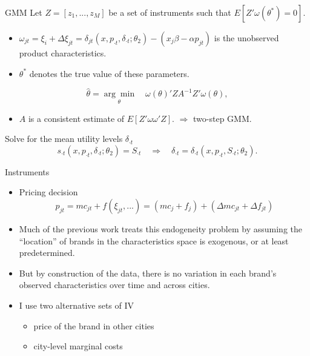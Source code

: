 \documentclass{beamer}
\begin{document}
\begin{frame}{GMM}
	Let $Z=[z_1,...,z_M]$ be a set of instruments such that $E[Z'\omega(\theta^*)=0]$.
	\begin{itemize}
		\item $\omega_{jt}=\xi_i+\Delta\xi_{jt}=\delta_{jt}(x,p_{\cdot t},\delta_{\cdot t};\theta_2)-(x_j\beta-\alpha p_{jt})$ is the unobserved product characteristics.
		\item $\theta^*$ denotes the true value of these parameters.
	\end{itemize}

	\begin{equation}
		\hat{\theta}=\underset{\theta}{\arg\min}\quad \omega(\theta)'ZA^{-1}Z'\omega(\theta),
	\end{equation}

	\begin{itemize}
		\item $A$ is a consistent estimate of $E[Z'\omega\omega'Z]$. $\Rightarrow$ two-step GMM.
	\end{itemize}
	\medskip

	Solve for the mean utility levels $\delta_{\cdot t}$
	\begin{equation}
		s_{\cdot t}(x,p_{\cdot t},\delta_{\cdot t};\theta_2)=S_{\cdot t} \quad\Rightarrow\quad \delta_{\cdot t}=\delta_{\cdot t}(x,p_{\cdot t},S_{\cdot t};\theta_2).
	\end{equation}
\end{frame}
\begin{frame}{Instruments}
	\begin{itemize}
		\item Pricing decision
		\begin{equation}
			p_{jt}=mc_{jt}+f(\xi_{jt},...)=(mc_j+f_j)+(\Delta mc_{jt}+\Delta f_{jt})
		\end{equation}
		\item Much of the previous work treats this endogeneity problem by assuming the “location” of brands in the characteristics space is exogenous, or at least predetermined.
		\item But by construction of the data, there is no variation in each brand’s observed characteristics over time and across cities.
		\item I use two alternative sets of IV
		\begin{itemize}
			\item price of the brand in other cities
			\item city-level marginal costs
		\end{itemize}
	\end{itemize}
\end{frame}
\end{document}
